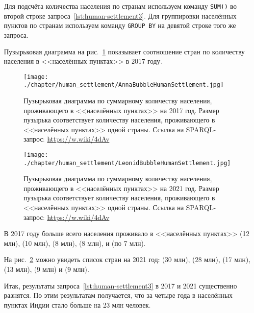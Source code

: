 Для подсчёта количества населения по странам 
используем команду \lstinline|SUM()| во второй строке запроса~\ref{lst:human-settlement3}. 
Для группировки населённых пунктов по странам 
используем команду \lstinline|GROUP BY| на девятой строке того же запроса.

Пузырьковая диаграмма на рис.~\ref{fig:human-settlement-1} 
показывает соотношение стран по количеству населения в <<населённых пунктах>> в 2017 году.

\begin{figure}
\centering
	\texttt{[image: ./chapter/human\_settlement/AnnaBubbleHumanSettlement.jpg]}
	\label{fig:human-settlement-1}
    \caption[Пузырьковая диаграмма с суммарным количеством населения в населённых пунктах, 2017.]{Пузырьковая диаграмма  по суммарному количеству населения, проживающего в <<населённых пунктах>> на 2017 год. Размер пузырька соответствует количеству населения, проживающего в <<населённых пунктах>> одной страны. Ссылка на SPARQL-запрос: \href{https://w.wiki/4dAv}{https://w.wiki/4dAv}}
\end{figure}

\begin{figure}
\centering
	\texttt{[image: ./chapter/human\_settlement/LeonidBubbleHumanSettlement.jpg]}
	\label{fig:human-settlement-2}
	\caption[Пузырьковая диаграмма  по суммарному количеству населения в населённых пунктах, 2021.]{Пузырьковая диаграмма  по суммарному количеству населения, проживающего в <<населённых пунктах>> на 2021 год. Размер пузырька соответствует количеству населения, проживающего в <<населённых пунктах>> одной страны. Ссылка на SPARQL-запрос: \href{https://w.wiki/4dAv}{https://w.wiki/4dAv}}
\end{figure}

В 2017 году больше всего населения проживало в <<населённых пунктах>> 
 (\num{12} млн), 
 (\num{10} млн), 
 (\num{8} млн), 
 (\num{8} млн), 
 и 
 (по \num{7} млн). 

На рис.~\ref{fig:human-settlement-2} можно увидеть список стран на 2021 год: 
 (\num{30} млн), 
 (\num{28} млн), 
 (\num{17} млн), 
 (\num{13} млн), 
 (\num{9} млн) и 
 (\num{9} млн). 

Итак, результаты запроса~\ref{lst:human-settlement3} в 2017 и 2021 существенно разнятся. 
По этим результатам получается, что за четыре года 
в населённых пунктах Индии стало больше на 23 млн человек. 


